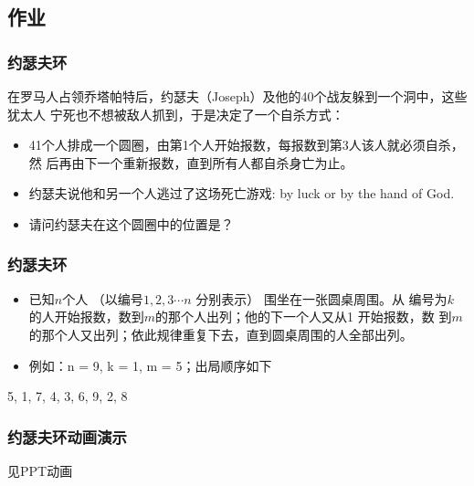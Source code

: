 \subsection{作业}
\begin{frame}[fragile]
  \frametitle{约瑟夫环}

  在罗马人占领乔塔帕特后，约瑟夫（Joseph）及他的40个战友躲到一个洞中，这些犹太人
  宁死也不想被敌人抓到，于是决定了一个自杀方式：

  \begin{itemize}
    \item 41个人排成一个圆圈，由第1个人开始报数，每报数到第3人该人就必须自杀，然
      后再由下一个重新报数，直到所有人都自杀身亡为止。
  \item 约瑟夫说他和另一个人逃过了这场死亡游戏: by luck or by the hand of God.
  \item 请问约瑟夫在这个圆圈中的位置是？
  \end{itemize}
\end{frame}

\begin{frame}[fragile]
  \frametitle{约瑟夫环}

  \begin{itemize}
  \item 已知$n$个人 （以编号$1, 2, 3 \cdots n$ 分别表示） 围坐在一张圆桌周围。从
    编号为$k$ 的人开始报数，数到$m$的那个人出列；他的下一个人又从1 开始报数，数
    到$m$的那个人又出列；依此规律重复下去，直到圆桌周围的人全部出列。

  \item 例如：n = 9, k = 1, m = 5；出局顺序如下

  \end{itemize}
  \begin{center}
    \scalebox{0.6} {
    }

    5, 1, 7, 4, 3, 6, 9, 2, 8
  \end{center}
\end{frame}

\begin{frame}[fragile]
  \frametitle{约瑟夫环动画演示}
  见PPT动画
\end{frame}
